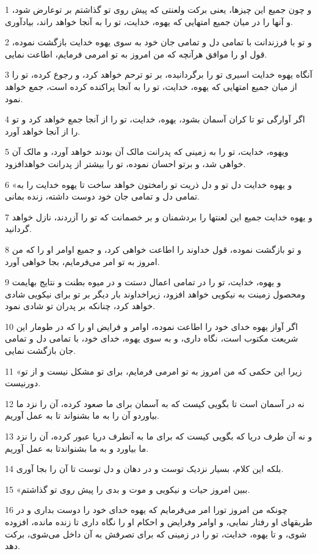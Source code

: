 \par 1 و چون جمیع این چیزها، یعنی برکت ولعنتی که پیش روی تو گذاشتم بر توعارض شود، و آنها را در میان جمیع امتهایی که یهوه، خدایت، تو را به آنجا خواهد راند، بیادآوری.
\par 2 و تو با فرزندانت با تمامی دل و تمامی جان خود به سوی یهوه خدایت بازگشت نموده، قول او را موافق هر‌آنچه که من امروز به تو امرمی فرمایم، اطاعت نمایی.
\par 3 آنگاه یهوه خدایت اسیری تو را برگردانیده، بر تو ترحم خواهد کرد، و رجوع کرده، تو را از میان جمیع امتهایی که یهوه، خدایت، تو را به آنجا پراکنده کرده است، جمع خواهد نمود.
\par 4 اگر آوارگی تو تا کران آسمان بشود، یهوه، خدایت، تو را از آنجا جمع خواهد کرد و تو را از آنجا خواهد آورد.
\par 5 ویهوه، خدایت، تو را به زمینی که پدرانت مالک آن بودند خواهد آورد، و مالک آن خواهی شد، و برتو احسان نموده، تو را بیشتر از پدرانت خواهدافزود.
\par 6 «و یهوه خدایت دل تو و دل ذریت تو رامختون خواهد ساخت تا یهوه خدایت را به تمامی دل و تمامی جان خود دوست داشته، زنده بمانی.
\par 7 و یهوه خدایت جمیع این لعنتها را بردشمنان و بر خصمانت که تو را آزردند، نازل خواهد گردانید.
\par 8 و تو بازگشت نموده، قول خداوند را اطاعت خواهی کرد، و جمیع اوامر او را که من امروز به تو امر می‌فرمایم، بجا خواهی آورد.
\par 9 و یهوه، خدایت، تو را در تمامی اعمال دستت و در میوه بطنت و نتایج بهایمت ومحصول زمینت به نیکویی خواهد افزود، زیراخداوند بار دیگر بر تو برای نیکویی شادی خواهد کرد، چنانکه بر پدران تو شادی نمود.
\par 10 اگر آواز یهوه خدای خود را اطاعت نموده، اوامر و فرایض او را که در طومار این شریعت مکتوب است، نگاه داری، و به سوی یهوه، خدای خود، با تمامی دل و تمامی جان بازگشت نمایی.
\par 11 «زیرا این حکمی که من امروز به تو امرمی فرمایم، برای تو مشکل نیست و از تو دورنیست.
\par 12 نه در آسمان است تا بگویی کیست که به آسمان برای ما صعود کرده، آن را نزد ما بیاوردو آن را به ما بشنواند تا به عمل آوریم.
\par 13 و نه آن طرف دریا که بگویی کیست که برای ما به آنطرف دریا عبور کرده، آن را نزد ما بیاورد و به ما بشنواندتا به عمل آوریم.
\par 14 بلکه این کلام، بسیار نزدیک توست و در دهان و دل توست تا آن را بجا آوری.
\par 15 «ببین امروز حیات و نیکویی و موت و بدی را پیش روی تو گذاشتم.
\par 16 چونکه من امروز تورا امر می‌فرمایم که یهوه خدای خود را دوست بداری و در طریقهای او رفتار نمایی، و اوامر وفرایض و احکام او را نگاه داری تا زنده مانده، افزوده شوی، و تا یهوه، خدایت، تو را در زمینی که برای تصرفش به آن داخل می‌شوی، برکت دهد.
